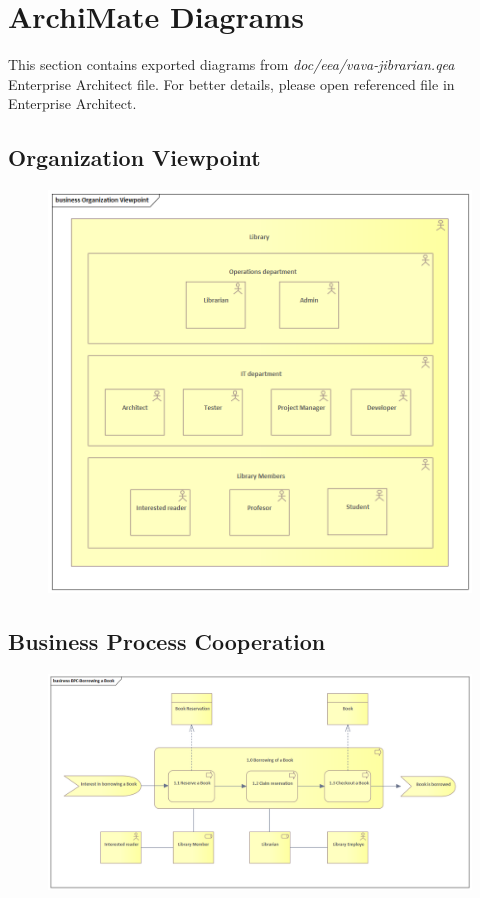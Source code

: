 \documentclass[11pt,twoside,a4paper]{article}
\begin{document}
\pagebreak
\section{ArchiMate Diagrams}

This section contains exported diagrams from \emph{doc/eea/vava-jibrarian.qea}
Enterprise Architect file. For better details, please open referenced file
in Enterprise Architect.

\pagebreak
\subsection{Organization Viewpoint}
\begin{figure}[!ht]
    \includegraphics[scale=.9]{../ea/Organization Viewpoint.png}
    \centering
\end{figure}

\pagebreak
\subsection{Business Process Cooperation}
\begin{figure}[!ht]
    \includegraphics[scale=.65]{../ea/BPC-Borrowing a Book.png}
    \centering
\end{figure}
\end{document}
